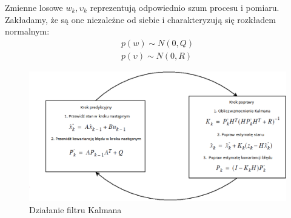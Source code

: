 Zmienne losowe $w_k, \upsilon_k$ reprezentują odpowiednio szum procesu i pomiaru. Zakładamy, że są one niezależne od siebie i charakteryzują się rozkładem normalnym:
\begin{equation}
\begin{split}
 p(w) \sim N(0,Q) \\
 p(\upsilon) \sim N(0,R)
 \end{split}
\end{equation}

\begin{figure}
\centering
	\includegraphics[width=\textwidth]{ECG_BASELINE/figures/KF.png}
\caption{Działanie filtru Kalmana}
\label{Kalman}
\end{figure}

